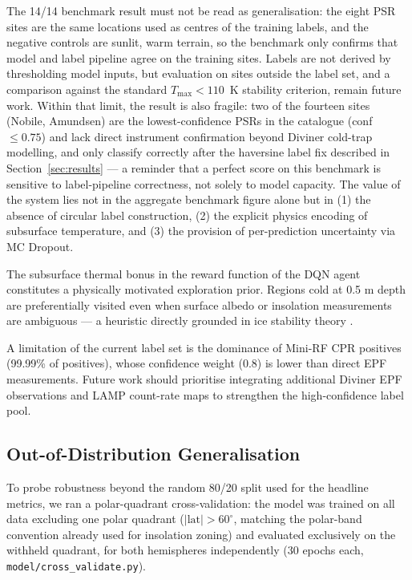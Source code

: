 \documentclass[12pt,a4paper]{article}
\begin{document}
The 14/14 benchmark result must not be read as generalisation: the eight PSR
sites are the same locations used as centres of the training labels, and the
negative controls are sunlit, warm terrain, so the benchmark only confirms that
model and label pipeline agree on the training sites. Labels are not derived by
thresholding model inputs, but evaluation on sites outside the label set, and a
comparison against the standard $T_{\max} < 110$~K stability criterion, remain
future work. Within that limit, the result is also fragile: two of the fourteen sites (Nobile, Amundsen) are the lowest-confidence PSRs
in the catalogue (conf~$\leq 0.75$) and lack direct instrument confirmation beyond
Diviner cold-trap modelling, and only classify correctly after the haversine label
fix described in Section~\ref{sec:results} — a reminder that a perfect score on
this benchmark is sensitive to label-pipeline correctness, not solely to model
capacity. The value of the system lies not in the aggregate benchmark figure alone
but in (1) the absence of circular label construction, (2) the explicit physics
encoding of subsurface temperature, and (3) the provision of per-prediction
uncertainty via MC Dropout.

The subsurface thermal bonus in the reward function of the DQN agent constitutes
a physically motivated exploration prior. Regions cold at 0.5 m depth are
preferentially visited even when surface albedo or insolation measurements are
ambiguous — a heuristic directly grounded in ice stability theory \citep{paige2010}.

A limitation of the current label set is the dominance of Mini-RF CPR positives
(99.99\% of positives), whose confidence weight (0.8) is lower than direct
EPF measurements. Future work should prioritise integrating additional Diviner EPF
observations and LAMP count-rate maps to strengthen the high-confidence label pool.

\subsection{Out-of-Distribution Generalisation}
\label{sec:ood}

To probe robustness beyond the random 80/20 split used for the headline metrics,
we ran a polar-quadrant cross-validation: the model was trained on all data
excluding one polar quadrant ($|\text{lat}| > 60^\circ$, matching the polar-band
convention already used for insolation zoning) and evaluated exclusively on the
withheld quadrant, for both hemispheres independently (30 epochs each,
\texttt{model/cross\_validate.py}).
\end{document}
